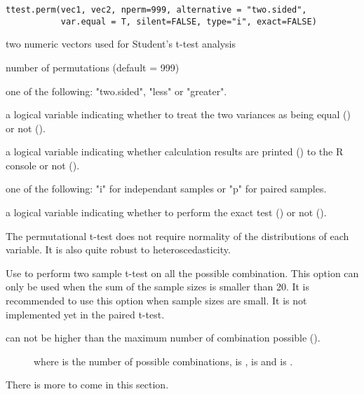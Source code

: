 \documentclass[a4paper]{book}
\begin{document}
%
\begin{Usage}
\begin{verbatim}
ttest.perm(vec1, vec2, nperm=999, alternative = "two.sided",
           var.equal = T, silent=FALSE, type="i", exact=FALSE)
\end{verbatim}
\end{Usage}
%
\begin{Arguments}
\begin{ldescription}
\item[\code{vec1, vec2 }] 
two numeric vectors used for Student's t-test analysis

\item[\code{nperm }] 
number of permutations (default = 999)

\item[\code{alternative }] 
one of the following: "two.sided", "less" or "greater".

\item[\code{var.equal }] 
a logical variable indicating whether to treat the two variances as being equal () or not ().

\item[\code{silent }] 
a logical variable indicating whether calculation results are printed () to the R console or not ().

\item[\code{type }] 
one of the following: "i" for independant samples or "p" for paired samples.

\item[\code{exact }] 
a logical variable indicating whether to perform the exact test () or not ().

\end{ldescription}
\end{Arguments}
%
\begin{Details}\relax
The permutational t-test does not require normality of the distributions of each variable.
It is also quite robust to heteroscedasticity.

Use  to perform two sample t-test on all the possible combination.
This option can only be used when the sum of the sample sizes  is smaller than 20.
It is recommended to use this option when sample sizes are small.
It is not implemented yet in the paired t-test.

 can not be higher than the maximum number of combination possible ().

\begin{description}

\item[] 


where  is the number of possible combinations, 
is ,  is
 and  is
.
\end{description}


There is more to come in this section.

\end{Details}
\end{document}
